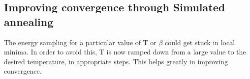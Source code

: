 \documentclass[book.tex]{subfiles}
\begin{document}
\subsection{Improving convergence through Simulated annealing}

The energy sampling for a particular value of T or $\beta$ could get stuck in local minima.  In order to avoid this, T is now ramped down from a large value to the desired temperature, in appropriate steps. This helps greatly in improving convergence.


\end{document}
